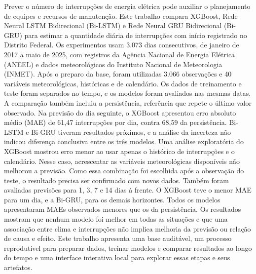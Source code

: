 Prever o número de interrupções de energia elétrica pode auxiliar o planejamento de equipes e recursos de manutenção. Este trabalho compara XGBoost, Rede Neural LSTM Bidirecional (Bi-LSTM) e Rede Neural GRU Bidirecional (Bi-GRU) para estimar a quantidade diária de interrupções com início registrado no Distrito Federal. Os experimentos usam 3.073 dias consecutivos, de janeiro de 2017 a maio de 2025, com registros da Agência Nacional de Energia Elétrica (ANEEL) e dados meteorológicos do Instituto Nacional de Meteorologia (INMET). Após o preparo da base, foram utilizadas 3.066 observações e 40 variáveis meteorológicas, históricas e de calendário. Os dados de treinamento e teste foram separados no tempo, e os modelos foram avaliados nas mesmas datas. A comparação também incluiu a persistência, referência que repete o último valor observado. Na previsão do dia seguinte, o XGBoost apresentou erro absoluto médio (MAE) de 61,47 interrupções por dia, contra 68,59 da persistência. Bi-LSTM e Bi-GRU tiveram resultados próximos, e a análise da incerteza não indicou diferença conclusiva entre os três modelos. Uma análise exploratória do XGBoost mostrou erro menor ao usar apenas o histórico de interrupções e o calendário. Nesse caso, acrescentar as variáveis meteorológicas disponíveis não melhorou a previsão. Como essa combinação foi escolhida após a observação do teste, o resultado precisa ser confirmado com novos dados. Também foram avaliadas previsões para 1, 3, 7 e 14 dias à frente. O XGBoost teve o menor MAE para um dia, e a Bi-GRU, para os demais horizontes. Todos os modelos apresentaram MAEs observados menores que os da persistência. Os resultados mostram que nenhum modelo foi melhor em todas as situações e que uma associação entre clima e interrupções não implica melhoria da previsão ou relação de causa e efeito. Este trabalho apresenta uma base auditável, um processo reprodutível para preparar dados, treinar modelos e comparar resultados ao longo do tempo e uma interface interativa local para explorar essas etapas e seus artefatos.
